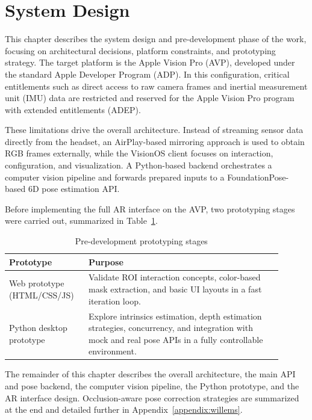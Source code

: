 \section{System Design}
\label{sec:systemdesign}

This chapter describes the system design and pre-development phase of the work, focusing on architectural decisions, platform constraints, and prototyping strategy. The target platform is the Apple Vision Pro (AVP), developed under the standard Apple Developer Program (ADP). In this configuration, critical entitlements such as direct access to raw camera frames and inertial measurement unit (IMU) data are restricted and reserved for the Apple Vision Pro program with extended entitlements (ADEP).

These limitations drive the overall architecture. Instead of streaming sensor data directly from the headset, an AirPlay-based mirroring approach is used to obtain RGB frames externally, while the VisionOS client focuses on interaction, configuration, and visualization. A Python-based backend orchestrates a computer vision pipeline and forwards prepared inputs to a FoundationPose-based 6D pose estimation API.

Before implementing the full AR interface on the AVP, two prototyping stages were carried out, summarized in Table~\ref{tab:prototyping-stages}.

\begin{table}[H]
    \centering
    \caption{Pre-development prototyping stages}
    \label{tab:prototyping-stages}
    \begin{tabular}{p{0.25\linewidth}p{0.65\linewidth}}
        \toprule
        \textbf{Prototype} & \textbf{Purpose} \\
        \midrule
        Web prototype (HTML/CSS/JS) &
        Validate ROI interaction concepts, color-based mask extraction, and basic UI layouts in a fast iteration loop. \\
        Python desktop prototype &
        Explore intrinsics estimation, depth estimation strategies, concurrency, and integration with mock and real pose APIs in a fully controllable environment. \\
        \bottomrule
    \end{tabular}
\end{table}

The remainder of this chapter describes the overall architecture, the main API and pose backend, the computer vision pipeline, the Python prototype, and the AR interface design. Occlusion-aware pose correction strategies are summarized at the end and detailed further in Appendix~\ref{appendix:willems}.

